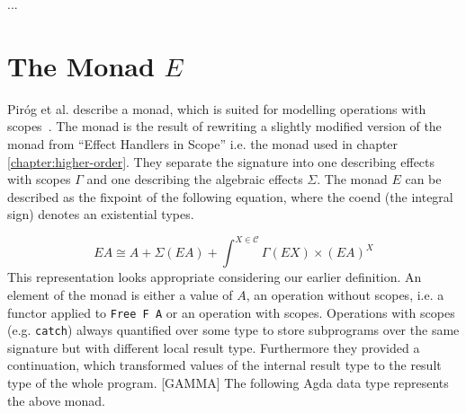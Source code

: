

...

\section{The Monad $E$}

Piróg et al. describe a monad, which is suited for modelling operations with
scopes~\cite{DBLP:conf/lics/PirogSWJ18}.
The monad is the result of rewriting a slightly modified version of the monad
from ``Effect Handlers in Scope'' i.e. the monad used in chapter
\ref{chapter:higher-order}.
They separate the signature into one describing effects with scopes $\Gamma$ and
one describing the algebraic effects $\Sigma$.
The monad $E$ can be described as the fixpoint of the following equation, where
the coend (the integral sign) denotes an existential types.

\[
  EA \cong A + \Sigma{}(EA) + \int^{X\in\mathscr{C}} \Gamma{}(EX) \times (EA)^X
\]
This representation looks appropriate considering our earlier definition.
An element of the monad is either a value of $A$, an operation without scopes,
i.e. a functor applied to \texttt{Free F A} or an operation with scopes.
Operations with scopes (e.g. \texttt{catch}) always quantified over some type to
store subprograms over the same signature but with different local result type.
Furthermore they provided a continuation, which transformed values of the
internal result type to the result type of the whole program.
[GAMMA]
The following Agda data type represents the above monad.

